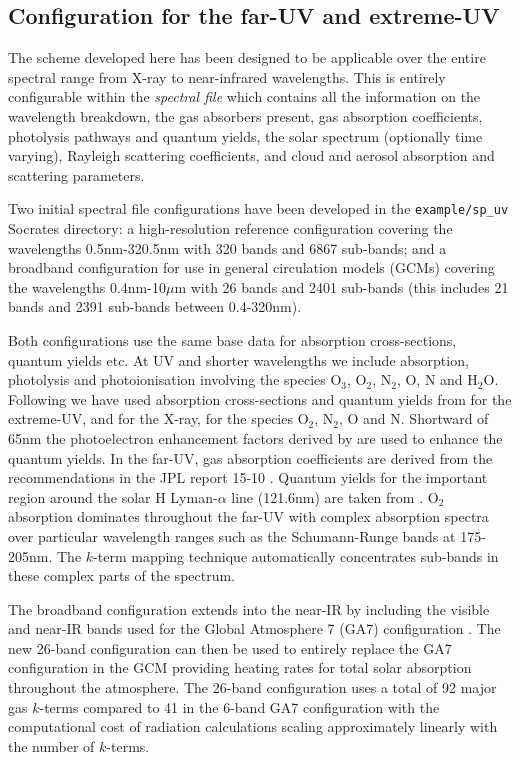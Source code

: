 \subsection{Configuration for the far-UV and extreme-UV}
The scheme developed here has been designed to be applicable over the entire spectral range from X-ray to near-infrared
wavelengths. This is entirely configurable within the {\em spectral file} which
contains all the information on the wavelength breakdown, the gas absorbers present, gas absorption
coefficients, photolysis pathways and quantum yields, the solar spectrum (optionally time varying),
Rayleigh scattering coefficients, and cloud and aerosol absorption and scattering parameters.

Two initial spectral file configurations have been developed in the {\tt example/sp\_uv} Socrates directory: a high-resolution reference configuration covering the wavelengths 0.5nm-320.5nm with 320 bands and 6867 sub-bands; and a broadband configuration for use in general circulation models (GCMs) covering the wavelengths 0.4nm-10$\mu$m with 26 bands and 2401 sub-bands (this includes 21 bands and 2391 sub-bands between 0.4-320nm).

Both configurations use the same base data for absorption cross-sections, quantum yields etc. At UV and shorter wavelengths we include absorption, photolysis and photoionisation involving the species O$_3$, O$_2$, N$_2$, O, N and H$_2$O. Following \cite{Solomon05} we
have used absorption cross-sections and quantum yields from \cite{Fennelly92} for the extreme-UV, and \cite{Henke93}
for the X-ray, for the species O$_2$, N$_2$, O and N. Shortward of 65nm the photoelectron enhancement factors derived 
by \cite{Solomon05} are used to enhance the quantum yields. In the far-UV, gas absorption coefficients are derived from the
recommendations in the JPL report 15-10 \cite{jpl15-10}. Quantum yields for the important
region around the solar H Lyman-$\alpha$ line (121.6nm) are taken from \cite{Lacoursiere99}.
O$_2$ absorption dominates throughout the far-UV
with complex absorption spectra over particular wavelength ranges such as the Schumann-Runge bands at 175-205nm.
The $k$-term mapping technique automatically concentrates sub-bands in these complex parts of the spectrum.

The broadband configuration extends into the near-IR by including the visible and near-IR bands used for the Global Atmosphere 7 (GA7) configuration \cite{Walters19}. The new 26-band configuration can then be used to entirely replace the GA7 configuration in the GCM providing heating rates for total solar absorption throughout the atmosphere. The 26-band configuration uses a total of 92 major gas $k$-terms compared to 41 in the 6-band GA7 configuration with the computational cost of radiation calculations scaling approximately linearly with the number of $k$-terms.

